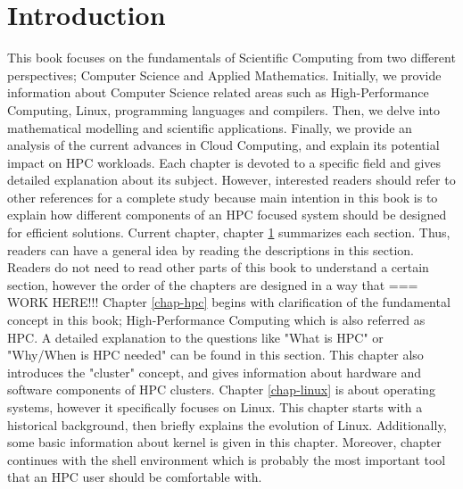 \chapter{Introduction} \label{chap-introduction}
This book focuses on the fundamentals of Scientific Computing from two different perspectives;
Computer Science and Applied Mathematics. Initially, we provide information about Computer
Science related areas such as High-Performance Computing, Linux, programming languages
and compilers. Then, we delve into mathematical modelling and scientific applications. 
Finally, we provide an analysis of the current advances in Cloud Computing, and explain its 
potential impact on HPC workloads.
\newline \newline 
Each chapter is devoted to a specific field and gives detailed explanation about its subject.
However, interested readers should refer to other references for a complete study because main
intention in this book is to explain how different components of an HPC focused system should be
designed for efficient solutions.
\newline \newline 
Current chapter, chapter \ref{chap-introduction} summarizes each section. Thus, readers can have
a general idea by reading the descriptions in this section. Readers do not need to read
other parts of this book to understand a certain section, however the order of the chapters
are designed in a way that === WORK HERE!!!
\newline \newline 
Chapter \ref{chap-hpc} begins with clarification of the fundamental concept in this book; 
High-Performance Computing which is also referred as HPC. A detailed explanation to the
questions like "What is HPC" or "Why/When is HPC needed" can be found in this section. This
chapter also introduces the "cluster" concept, and gives information about hardware and software
components of HPC clusters.  
\newline \newline 
Chapter \ref{chap-linux} is about operating systems, however it specifically focuses on Linux.
This chapter starts with a historical background, then briefly explains the evolution of Linux.
Additionally, some basic information about kernel is given in this chapter. Moreover, chapter 
continues with the shell environment which is probably the most important tool that an HPC user
should be comfortable with.
\newline \newline 
